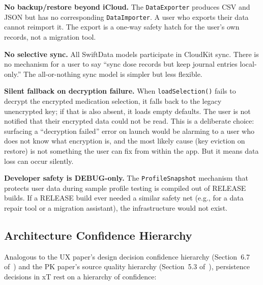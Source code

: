 \documentclass[11pt,a4paper]{article}
\newcommand{\code}[1]{\texttt{\small #1}}
\begin{document}
\textbf{No backup/restore beyond iCloud.} The \code{DataExporter} produces
CSV and JSON but has no corresponding \code{DataImporter}. A user who
exports their data cannot reimport it. The export is a one-way safety hatch
for the user's own records, not a migration tool.

\textbf{No selective sync.} All SwiftData models participate in CloudKit
sync. There is no mechanism for a user to say ``sync dose records but keep
journal entries local-only.'' The all-or-nothing sync model is simpler but
less flexible.

\textbf{Silent fallback on decryption failure.} When
\code{loadSelection()} fails to decrypt the encrypted medication selection,
it falls back to the legacy unencrypted key; if that is also absent, it
loads empty defaults. The user is not notified that their encrypted data
could not be read. This is a deliberate choice: surfacing a ``decryption
failed'' error on launch would be alarming to a user who does not know what
encryption is, and the most likely cause (key eviction on restore) is not
something the user can fix from within the app. But it means data loss can
occur silently.

\textbf{Developer safety is DEBUG-only.} The \code{ProfileSnapshot}
mechanism that protects user data during sample profile testing is compiled
out of RELEASE builds. If a RELEASE build ever needed a similar safety net
(e.g., for a data repair tool or a migration assistant), the infrastructure
would not exist.

\subsection{Architecture Confidence Hierarchy}
\label{sec:confidence}

Analogous to the UX paper's design decision confidence hierarchy
(Section~6.7 of~\cite{xtux}) and the PK paper's source quality hierarchy
(Section~5.3 of~\cite{xtpk}), persistence decisions in xT rest on a
hierarchy of confidence:
\end{document}

